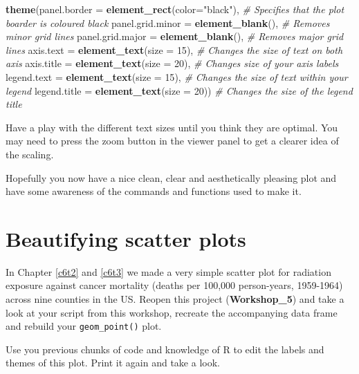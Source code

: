 \documentclass[
]{book}
\newenvironment{Shaded}{\begin{snugshade}}{\end{snugshade}}
\newcommand{\AttributeTok}[1]{\textcolor[rgb]{0.13,0.29,0.53}{#1}}
\newcommand{\CommentTok}[1]{\textcolor[rgb]{0.56,0.35,0.01}{\textit{#1}}}
\newcommand{\DecValTok}[1]{\textcolor[rgb]{0.00,0.00,0.81}{#1}}
\newcommand{\FunctionTok}[1]{\textcolor[rgb]{0.13,0.29,0.53}{\textbf{#1}}}
\newcommand{\NormalTok}[1]{#1}
\newcommand{\StringTok}[1]{\textcolor[rgb]{0.31,0.60,0.02}{#1}}
\begin{document}
\begin{Shaded}
\begin{Highlighting}[]
\FunctionTok{theme}\NormalTok{(}\AttributeTok{panel.border =} \FunctionTok{element\_rect}\NormalTok{(}\AttributeTok{color=}\StringTok{"black"}\NormalTok{), }\CommentTok{\# Specifies that the plot boarder is coloured black}
        \AttributeTok{panel.grid.minor =} \FunctionTok{element\_blank}\NormalTok{(), }\CommentTok{\# Removes minor grid lines }
        \AttributeTok{panel.grid.major =} \FunctionTok{element\_blank}\NormalTok{(), }\CommentTok{\# Removes major grid lines }
        \AttributeTok{axis.text =} \FunctionTok{element\_text}\NormalTok{(}\AttributeTok{size =} \DecValTok{15}\NormalTok{), }\CommentTok{\# Changes the size of text on both axis }
        \AttributeTok{axis.title =} \FunctionTok{element\_text}\NormalTok{(}\AttributeTok{size =} \DecValTok{20}\NormalTok{), }\CommentTok{\# Changes size of your axis labels }
        \AttributeTok{legend.text =} \FunctionTok{element\_text}\NormalTok{(}\AttributeTok{size =} \DecValTok{15}\NormalTok{), }\CommentTok{\# Changes the size of text within your legend}
        \AttributeTok{legend.title =} \FunctionTok{element\_text}\NormalTok{(}\AttributeTok{size =} \DecValTok{20}\NormalTok{)) }\CommentTok{\# Changes the size of the legend title}
\end{Highlighting}
\end{Shaded}

Have a play with the different text sizes until you think they are optimal. You may need to press the zoom button in the viewer panel to get a clearer idea of the scaling.

Hopefully you now have a nice clean, clear and aesthetically pleasing plot and have some awareness of the commands and functions used to make it.

\section{Beautifying scatter plots}\label{beautifying-scatter-plots}

In Chapter \ref{c6t2} and \ref{c6t3} we made a very simple scatter plot for radiation exposure against cancer mortality (deaths per 100,000 person-years, 1959-1964) across nine counties in the US. Reopen this project (\textbf{Workshop\_5}) and take a look at your script from this workshop, recreate the accompanying data frame and rebuild your \texttt{geom\_point()} plot.

Use you previous chunks of code and knowledge of R to edit the labels and themes of this plot. Print it again and take a look.
\end{document}
